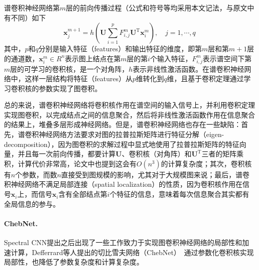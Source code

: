 \documentclass[final]{cvpr}
\newcommand{\mypara}[1]{\paragraph{#1.}}
\begin{document}
谱卷积神经网络第$m$层的前向传播过程（公式和符号等均采用本文记法，与原文中有不同）如下
\begin{equation}\label{equ:spectral-cnn-forward}
    \boldsymbol{x}_j^{m+1}=
    h \left(
        \boldsymbol{U}
        \sum_{i=1}^{p}
        F_{i,j}^m 
        \boldsymbol{U}^{\mathrm{T}}
        \boldsymbol{x}_i^{m}
    \right), \quad j=1,\cdots,q
\end{equation}
其中，$p$和$q$分别是输入特征（features）和输出特征的维度，即第$m$层和第$m+1$层的通道数，$\boldsymbol{x}_i^{m} \in R^n$表示图上结点在第$m$层的第$i$个输入特征，$F_{i,j}^m$表示谱空间下第$m$层的可学习的卷积核，是一个对角阵，$h$表示非线性激活函数。在谱卷积神经网络中，这样一层结构将特征（features）从$p$维转化到$q$维，且基于卷积定理通过学习卷积核的参数实现了图卷积。

总的来说，谱卷积神经网络将卷积核作用在谱空间的输入信号上，并利用卷积定理实现图卷积，以完成结点之间的信息聚合，然后将非线性激活函数作用在信息聚合的结果上，堆叠多层形成神经网络。但是，谱卷积神经网络也存在一些缺陷：首先，谱卷积神经网络方法要求对图的拉普拉斯矩阵进行特征分解（eigen-decomposition），因为图卷积的求解过程中显式地使用了拉普拉斯矩阵的特征向量，并且每一次前向传播，都要计算$\boldsymbol{U}$、卷积核（对角阵）和$\boldsymbol{U}^{\mathrm{T}}$三者的矩阵乘积，计算代价非常高，论文中也提到这会有$O \left( n^3 \right)$的计算复杂度；其次，卷积核有$n$个参数，而数$n$直接受到图规模的影响，尤其对于大规模图来说；最后，谱卷积神经网络不满足局部连接（spatial localization）的性质，因为卷积核作用在信号$\boldsymbol{x}_i$上，而信号$\boldsymbol{x}_i$含有全部结点第$i$个特征的信息，意味着每次信息聚合其实都有全局信息的参与。

\mypara{ChebNet} 
Spectral CNN提出之后出现了一些工作致力于实现图卷积神经网络的局部性和加速计算，Defferrard等人提出的切比雪夫网络（ChebNet）~\cite{defferrard2016convolutional}通过参数化卷积核实现局部性，也降低了参数复杂度和计算复杂度。
\end{document}
